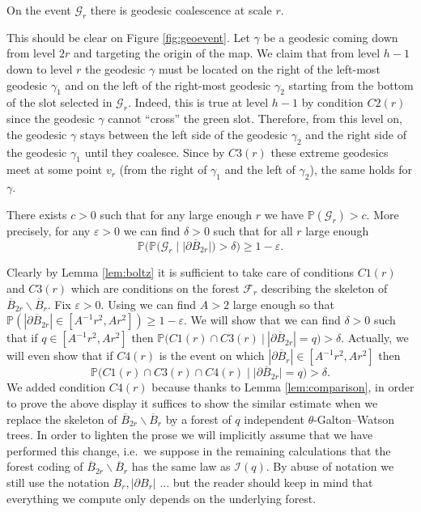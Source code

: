 \documentclass[10pt]{amsart}
\theoremstyle{definition}\newtheorem{defi}[theo]{Definition}\newtheorem{rema}[theo]{Remark}\newtheorem{exam}[theo]{Example}\newtheorem{exem}[theo]{Example}\newtheorem{nota}[theo]{Notation}
\begin{document}
\begin{lemma} On the event $  \mathcal{G}_{r}$ there is geodesic coalescence at scale $r$.
\end{lemma}
\proof This should be clear on Figure \ref{fig:geoevent}. Let $\gamma$ be a geodesic coming down from level $2r$ and targeting the origin of the map. We claim that from level $h-1$ down to level $r$ the geodesic $\gamma$ {must be located on the right of the left-most geodesic $\gamma_1$ and on the left of the right-most geodesic $\gamma_2$ starting from the bottom of the slot selected in $ \mathcal{G}_{r}$. Indeed, this is true at level $h-1$ by condition $C2(r)$ since the geodesic $\gamma$ cannot ``cross'' the green slot. {Therefore, from this level on, the geodesic $\gamma$ stays between the left side of the geodesic $\gamma_2$ and the right side of the geodesic $\gamma_1$ until they coalesce}. Since by $C3(r)$ these extreme geodesics meet at some point $v_{r}$ (from the right of $\gamma_{1}$ and the left of $\gamma_{2}$), the same holds for $\gamma$}. \endproof

\begin{proposition} \label{prop:positive} There exists $c>0$ such that for any large enough $r$ we have $ \mathbb{P}( \mathcal{G}_{r}) > c$. More precisely, for any $ \varepsilon>0$ we can find $ \delta >0$ such that for all $r$ large enough
$$  \mathbb{P} \bigg( \mathbb{P} \big( \mathcal{G}_{r} \mid \big| \partial \overline{B}_{2r} \big| \big) > \delta \bigg) \geq 1- \varepsilon.$$
\end{proposition}
\proof Clearly by Lemma \ref{lem:boltz} it is sufficient to take care of conditions $C1(r)$ and $C3(r)$ which are conditions on the forest $ \mathcal{F}_{r}$ describing  the skeleton of $ \overline{B}_{2r} \backslash \overline{B}_{r}$. Fix $ \varepsilon>0$. Using \cite[Remark 3]{CLGfpp} we can find $A>2$ large enough so that $ \mathbb{P}(|\partial \overline{B}_{2r}| \in [A^{-1}r^{2},Ar^{2}]) \geq 1 - \varepsilon$. We will show that we can find $\delta >0$ such that if $q \in  [A^{-1}r^{2},Ar^{2}]$ then  $\mathbb{P} \big( C1(r) \cap C3(r) ~\big | ~ | \partial \overline{B}_{2r} | = q \big) > \delta$.
Actually, we will even show that if $C4(r)$ is the event on which $| \partial \overline{B}_{r}| \in [A^{-1}r^{2}, Ar^{2}]$ then
$$\mathbb{P} \big( C1(r) \cap C3(r)  \cap C4(r) \mid | \partial \overline{B}_{2r} \big| = q \big) > \delta.$$
We added condition $C4(r)$ because thanks to  Lemma \ref{lem:comparison}, in order to prove the above display it suffices to show the similar estimate when we replace the skeleton of $ \overline{B}_{2r} \backslash \overline{B}_{r}$ by a forest of $q$ independent $\theta$-Galton--Watson trees. In order to lighten the prose we will implicitly assume that we have performed this change, i.e.~we suppose in the remaining calculations that the forest coding of $\overline{B}_{2r} \backslash \overline{B}_{r}$ has the same law as $ \mathcal{I}(q)$. By abuse of notation we still use the notation $B_r,|\partial B_r|$ ... but the reader should keep in mind that everything we compute only depends on the underlying forest.
\end{document}
